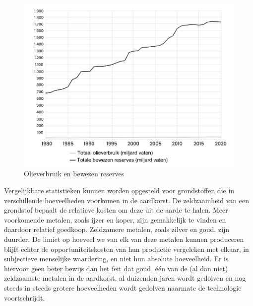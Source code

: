 \begin{figure}[!htb]
\centering
    \includegraphics[width=\textwidth]{figures/fig5-1.png}
\caption[Olieverbruik en bewezen reserves]{Olieverbruik en bewezen reserves\footnotemark}
\label{fig5}
\end{figure}

Vergelijkbare statistieken kunnen worden opgesteld voor grondstoffen die
in verschillende hoeveelheden voorkomen in de aardkorst. De zeldzaamheid
van een grondstof bepaalt de relatieve kosten om deze uit de aarde te
halen. Meer voorkomende metalen, zoals ijzer en koper, zijn gemakkelijk
te vinden en daardoor relatief goedkoop. Zeldzamere metalen, zoals
zilver en goud, zijn duurder. De limiet op hoeveel we van elk van deze
metalen kunnen produceren blijft echter de opportuniteitskosten van hun
productie vergeleken met elkaar, in subjectieve menselijke waardering,
en niet hun absolute hoeveelheid. Er is hiervoor geen beter bewijs dan
het feit dat goud, één van de (al dan niet) zeldzaamste metalen in de
aardkorst, al duizenden jaren wordt gedolven en nog steeds in steeds
grotere hoeveelheden wordt gedolven naarmate de technologie
voortschrijdt.

